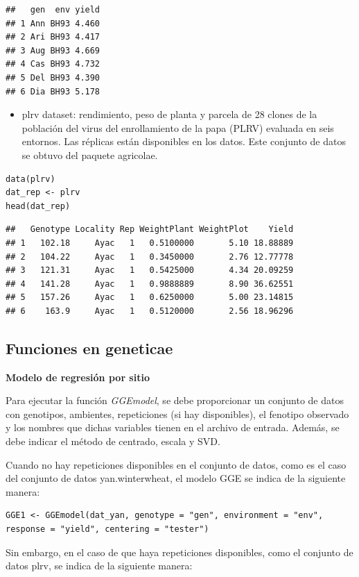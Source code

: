 \begin{verbatim}
##   gen  env yield
## 1 Ann BH93 4.460
## 2 Ari BH93 4.417
## 3 Aug BH93 4.669
## 4 Cas BH93 4.732
## 5 Del BH93 4.390
## 6 Dia BH93 5.178
\end{verbatim}
\begin{itemize}
\item plrv dataset: rendimiento, peso de planta y parcela de 28 clones de la población del virus del enrollamiento de la papa (PLRV) evaluada en seis entornos. Las réplicas están disponibles en los datos. Este conjunto de datos se obtuvo del paquete agricolae.
\end{itemize}
\begin{lstlisting}
data(plrv)
dat_rep <- plrv
head(dat_rep)
\end{lstlisting}


\begin{verbatim}
##   Genotype Locality Rep WeightPlant WeightPlot    Yield
## 1   102.18     Ayac   1   0.5100000       5.10 18.88889
## 2   104.22     Ayac   1   0.3450000       2.76 12.77778
## 3   121.31     Ayac   1   0.5425000       4.34 20.09259
## 4   141.28     Ayac   1   0.9888889       8.90 36.62551
## 5   157.26     Ayac   1   0.6250000       5.00 23.14815
## 6    163.9     Ayac   1   0.5120000       2.56 18.96296
\end{verbatim}

 
\subsection{Funciones en geneticae}

\textbf{Modelo de regresión por sitio}

Para ejecutar la función \emph{GGEmodel}, se debe proporcionar un conjunto de datos con genotipos, ambientes, repeticiones (si hay disponibles), el fenotipo observado y los nombres que dichas variables tienen en el archivo de entrada. Además, se debe indicar el método de centrado, escala y SVD.

Cuando no hay repeticiones disponibles en el conjunto de datos, como es el caso del conjunto de datos yan.winterwheat, el modelo GGE se indica de la siguiente manera:


\begin{lstlisting}
GGE1 <- GGEmodel(dat_yan, genotype = "gen", environment = "env", 
response = "yield", centering = "tester")
\end{lstlisting}


Sin embargo, en el caso de que haya repeticiones disponibles, como el conjunto de datos plrv, se indica de la siguiente manera:


